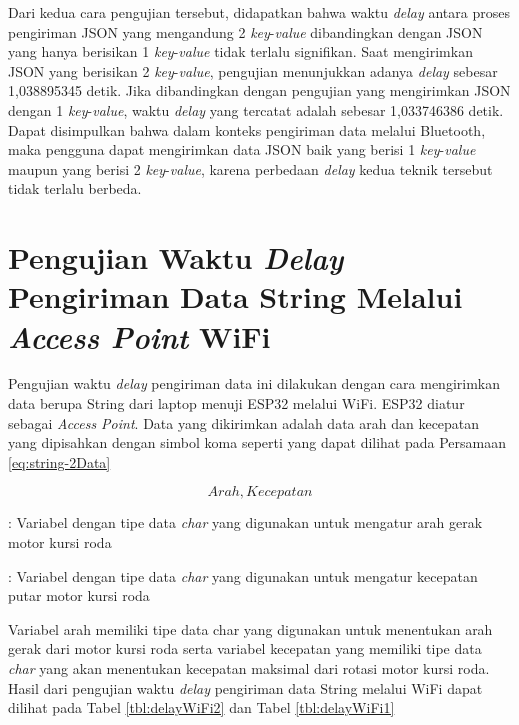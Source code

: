 Dari kedua cara pengujian tersebut, didapatkan bahwa waktu \emph{delay} antara proses pengiriman JSON yang mengandung 2 \emph{key}-\emph{value} dibandingkan dengan JSON yang hanya berisikan 1 \emph{key}-\emph{value} tidak terlalu signifikan. Saat mengirimkan JSON yang berisikan 2 \emph{key}-\emph{value}, pengujian menunjukkan adanya \emph{delay} sebesar 1,038895345 detik. Jika dibandingkan dengan pengujian yang mengirimkan JSON dengan 1 \emph{key}-\emph{value}, waktu \emph{delay} yang tercatat adalah sebesar 1,033746386 detik. Dapat disimpulkan bahwa dalam konteks pengiriman data melalui Bluetooth, maka pengguna dapat mengirimkan data JSON baik yang berisi 1 \emph{key}-\emph{value} maupun yang berisi 2 \emph{key}-\emph{value}, karena perbedaan \emph{delay} kedua teknik tersebut tidak terlalu berbeda.

\section{Pengujian Waktu \emph{Delay} Pengiriman Data String Melalui \emph{Access Point} WiFi}
\label{sec:delayWiFi}

Pengujian waktu \emph{delay} pengiriman data ini dilakukan dengan cara mengirimkan data berupa String dari laptop menuji ESP32 melalui WiFi. ESP32 diatur sebagai \emph{Access Point}. Data yang dikirimkan adalah data arah dan kecepatan yang dipisahkan dengan simbol koma seperti yang dapat dilihat pada Persamaan \ref{eq:string-2Data}

\begin{equation}
  \label{eq:string-2Data}
    Arah,Kecepatan
\end{equation}

\begin{description}[nolistsep]
  \item[Keterangan]
  \item[Arah] : Variabel dengan tipe data \emph{char} yang digunakan untuk mengatur arah gerak motor kursi roda
  \item[Kecepatan] : Variabel dengan tipe data \emph{char} yang digunakan untuk mengatur kecepatan putar motor kursi roda 
\end{description}

Variabel arah memiliki tipe data char yang digunakan untuk menentukan arah gerak dari motor kursi roda serta variabel kecepatan yang memiliki tipe data \emph{char} yang akan menentukan kecepatan maksimal dari rotasi motor kursi roda. Hasil dari pengujian waktu \emph{delay} pengiriman data String melalui WiFi dapat dilihat pada Tabel \ref{tbl:delayWiFi2} dan Tabel \ref{tbl:delayWiFi1}

